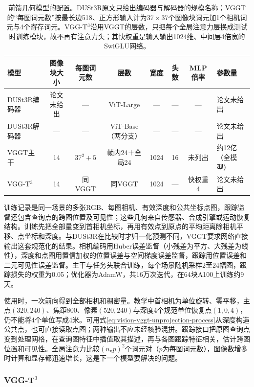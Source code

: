 \begin{table}[tbp]
 \centering
 \small
 \begin{tabular}{@{}lccccccl@{}}
 \toprule
 模型 & 图像块大小 & 每图词元数 & 层数 & 宽度 & 头数 & MLP倍率 & 参数量\\
 \midrule
 DUSt3R编码器 & 论文未给出 & — & ViT-Large & — & — & — & 论文未给出\\
 DUSt3R解码器 & — & — & ViT-Base（两分支） & — & — & — & 论文未给出\\
 VGGT主干 & 14 & $37^2+5$ & 帧内24＋全局24 & 1024 & 16 & 未列出 & 约12亿（全模型）\\
 VGG-T$^3$ & 14 & 同VGGT & 同VGGT & 1024 & — & 快权重4 & 论文未给出\\
 \bottomrule
 \end{tabular}
 \caption{前馈几何模型的配置。DUSt3R原文只给出编码器与解码器的规模名称；VGGT的“每图词元数”按最长边518、正方形输入计为$37\times37$个图像块词元加1个相机词元与4个寄存词元。VGG-T$^3$沿用VGGT的层数，只把每个全局注意力层换成测试时训练模块，故不再有注意力头；其快权重是输入输出1024维、中间层4倍宽的SwiGLU网络。}
 \label{tab:vision-recognition-ff-geometry-config}
\end{table}

训练记录是同一场景的多张RGB、每图相机、有效深度和公共坐标点图，跟踪监督还包含查询点的跨图位置及可见性；这些几何来自传感器、合成引擎或运动恢复结构。训练先把全部量变到首相机坐标，再用有效点到原点的平均距离除相机平移、点坐标和深度。与DUSt3R在比较时才归一化预测不同，VGGT要求网络直接输出这套规范化的结果。相机编码用Huber误差监督（小残差为平方、大残差为线性），深度和点图用置信加权的位置误差与空间梯度误差监督，跟踪用位置误差和二元可见性误差监督。主干与任务头联合训练，每个场景随机采样2至24幅图，跟踪损失的权重为0.05；优化器为AdamW，共16万次迭代，在64块A100上训练约9天。

使用时，一次前向得到全部相机和稠密量。教学中首相机为单位旋转、零平移，主点$(320,240)$、焦距800、像素$(520,240)$与深度4个规范单位恢复点$(1,0,4)$，仍不能将4个单位写成4米。可用式\eqref{eq:vision-vggt-unprojection-process}从深度构造公共点，也可直接读取点图；两种输出不应未经核验混拼。跟踪接口把原图查询点变到处理网格，在查询图特征中插值取其描述，再与各图跟踪特征相关，估计跨图位置和可见性。全局注意力比较$(n_{\mathrm v}p)^2$个词元对（$p$为每图词元数），图像数增多时计算和显存都迅速增长，这是下一个模型要解决的问题。

\subsubsection{\texorpdfstring{VGG-T$^3$}{VGG-T3}}
\label{sec:vision-recognition-vgg-t3}

